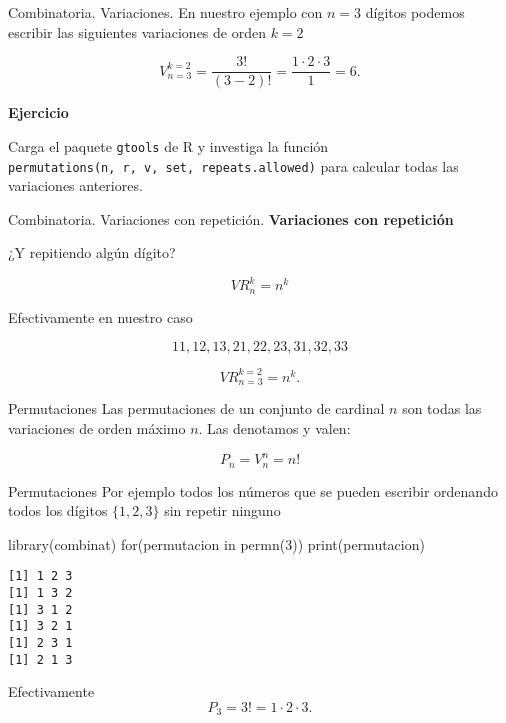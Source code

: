 \documentclass[
  ignorenonframetext,
  aspectratio=169]{beamer}
\newenvironment{Shaded}{\begin{snugshade}}{\end{snugshade}}
\newcommand{\ControlFlowTok}[1]{\textcolor[rgb]{0.00,0.23,0.31}{#1}}
\newcommand{\DecValTok}[1]{\textcolor[rgb]{0.68,0.00,0.00}{#1}}
\newcommand{\FunctionTok}[1]{\textcolor[rgb]{0.28,0.35,0.67}{#1}}
\newcommand{\NormalTok}[1]{\textcolor[rgb]{0.00,0.23,0.31}{#1}}
\begin{document}
\begin{frame}[fragile]{Combinatoria. Variaciones.}
\protect\hypertarget{combinatoria.-variaciones.-1}{}
En nuestro ejemplo con \(n=3\) dígitos podemos escribir las siguientes
variaciones de orden \(k=2\)

\[
V^{k=2}_{n=3}=\frac{3!}{(3-2)!}=\frac{1\cdot 2\cdot 3}{1}=6.
\]

\textbf{Ejercicio}

Carga el paquete \texttt{gtools} de R y investiga la función
\texttt{permutations(n,\ r,\ v,\ set,\ repeats.allowed)} para calcular
todas las variaciones anteriores.
\end{frame}

\begin{frame}{Combinatoria. Variaciones con repetición.}
\protect\hypertarget{combinatoria.-variaciones-con-repeticiuxf3n.}{}
\textbf{Variaciones con repetición}

¿Y repitiendo algún dígito?

\[VR_n^k=n^k\]

Efectivamente en nuestro caso

\[11,12,13,21,22,23,31,32,33\]

\[
VR^{k=2}_{n=3}=n^k.
\]
\end{frame}

\begin{frame}{Permutaciones}
\protect\hypertarget{permutaciones}{}
Las permutaciones de un conjunto de cardinal \(n\) son todas las
variaciones de orden máximo \(n\). Las denotamos y valen:

\[
P_n=V_n^n=n!
\]
\end{frame}

\begin{frame}[fragile]{Permutaciones}
\protect\hypertarget{permutaciones-1}{}
Por ejemplo todos los números que se pueden escribir ordenando todos los
dígitos \(\{1,2,3\}\) sin repetir ninguno

\begin{Shaded}
\begin{Highlighting}[]
\FunctionTok{library}\NormalTok{(combinat)}
\ControlFlowTok{for}\NormalTok{(permutacion }\ControlFlowTok{in} \FunctionTok{permn}\NormalTok{(}\DecValTok{3}\NormalTok{)) }\FunctionTok{print}\NormalTok{(permutacion)}
\end{Highlighting}
\end{Shaded}

\begin{verbatim}
[1] 1 2 3
[1] 1 3 2
[1] 3 1 2
[1] 3 2 1
[1] 2 3 1
[1] 2 1 3
\end{verbatim}

Efectivamente \[
P_3=3!=1\cdot  2\cdot 3.
\]
\end{frame}
\end{document}
